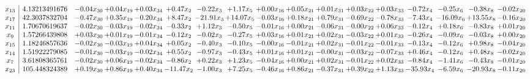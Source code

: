 \documentclass[9pt]{article}
\begin{document}
 \[\begin{array}{c| c c@{\hskip 2pt} c@{\hskip 2pt} c@{\hskip 2pt} c@{\hskip 2pt} c@{\hskip 2pt} c@{\hskip 2pt} c@{\hskip 2pt} c@{\hskip 2pt} c@{\hskip 2pt} c@{\hskip 2pt} c@{\hskip 2pt} c@{\hskip 2pt} c@{\hskip 2pt} c@{\hskip 2pt} c@{\hskip 2pt} }
 x_{13}   &  4.13213491676 & -0.04 x_{30} & +  0.04 x_{19} & +  0.03 x_{34} & +  0.47 x_{2} & -0.22 x_{3} & +  1.17 x_{5} & +  0.00 x_{16} & +  0.05 x_{21} & +  0.01 x_{31} & +  0.03 x_{22} & +  0.03 x_{33} & -0.72 x_{4} & -0.25 x_{6} & -0.38 x_{8} & -0.02 x_{20}\\
 x_{17}   &  42.3037832704 & -0.47 x_{30} & +  0.35 x_{19} & -0.20 x_{34} & +  8.47 x_{2} & -21.91 x_{3} & + 14.07 x_{5} & -0.03 x_{16} & +  0.18 x_{21} & +  0.79 x_{31} & -0.69 x_{22} & -0.78 x_{33} & -7.43 x_{4} & -16.09 x_{6} & + 13.55 x_{8} & -0.16 x_{20}\\
 x_{11}   &  1.70670619637 & -0.02 x_{30} & -0.03 x_{19} & -0.02 x_{34} & -0.33 x_{2} & +  1.12 x_{3} & -0.50 x_{5} & -0.01 x_{16} & +  0.00 x_{21} & -0.06 x_{31} & -0.00 x_{22} & +  0.06 x_{33} & -0.12 x_{4} & +  0.18 x_{6} & -0.83 x_{8} & +  0.01 x_{20}\\
 x_{9}   &  1.57266439808 & +  0.03 x_{30} & +  0.01 x_{19} & -0.01 x_{34} & -0.12 x_{2} & -0.02 x_{3} & -0.27 x_{5} & +  0.03 x_{16} & +  0.01 x_{21} & +  0.02 x_{31} & -0.03 x_{22} & +  0.01 x_{33} & -0.26 x_{4} & -0.09 x_{6} & -0.03 x_{8} & +  0.00 x_{20}\\
 x_{15}   &  1.18246857636 & -0.02 x_{30} & -0.03 x_{19} & +  0.04 x_{34} & +  0.05 x_{2} & -0.40 x_{3} & -0.10 x_{5} & -0.00 x_{16} & -0.01 x_{21} & +  0.02 x_{31} & -0.01 x_{22} & -0.01 x_{33} & -0.13 x_{4} & -0.12 x_{6} & +  0.98 x_{8} & -0.04 x_{20}\\
 x_{14}   &  1.51922279085 & -0.01 x_{30} & -0.03 x_{19} & -0.02 x_{34} & +  0.55 x_{2} & -0.97 x_{3} & -0.43 x_{5} & +  0.01 x_{16} & +  0.01 x_{21} & -0.00 x_{31} & -0.03 x_{22} & -0.07 x_{33} & +  0.46 x_{4} & -0.12 x_{6} & +  0.48 x_{8} & -0.02 x_{20}\\
 x_{7}   &  3.61808365761 & -0.02 x_{30} & +  0.06 x_{19} & -0.02 x_{34} & -0.86 x_{2} & +  0.22 x_{3} & +  1.23 x_{5} & -0.04 x_{16} & +  0.00 x_{21} & +  0.02 x_{31} & -0.01 x_{22} & +  0.02 x_{33} & -0.84 x_{4} & -1.41 x_{6} & -0.43 x_{8} & -0.01 x_{20}\\
 x_{23}   &  105.448324389 & +  0.19 x_{30} & +  0.86 x_{19} & +  0.40 x_{34} & -11.47 x_{2} & -1.00 x_{3} & +  7.25 x_{5} & -0.46 x_{16} & +  0.86 x_{21} & -0.37 x_{31} & +  0.39 x_{22} & +  1.13 x_{33} & -35.93 x_{4} & -6.59 x_{6} & -20.93 x_{8} & -0.11 x_{20}\\

\end{array}\]
\end{document}
